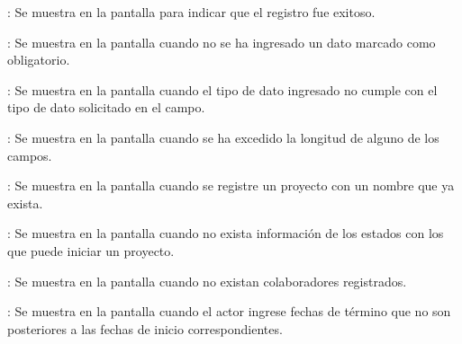 \begin{Citemize}
	\item {}: Se muestra en la pantalla  para indicar que el registro fue exitoso.
	\item {}: Se muestra en la pantalla  cuando no se ha ingresado un dato marcado como obligatorio.
	\item {}: Se muestra en la pantalla  cuando el tipo de dato ingresado no cumple con el tipo de dato solicitado en el campo.
	\item {}: Se muestra en la pantalla  cuando se ha excedido la longitud de alguno de los campos.
	\item {}: Se muestra en la pantalla  cuando se registre un proyecto con un nombre que ya exista.
	\item {}: Se muestra en la pantalla  cuando no exista información de los estados con los que puede iniciar un proyecto.
	\item {}: Se muestra en la pantalla  cuando no existan
	colaboradores registrados.
	\item {}: Se muestra en la pantalla  cuando el actor ingrese fechas de término que no son posteriores a las fechas de inicio correspondientes.
\end{Citemize}

